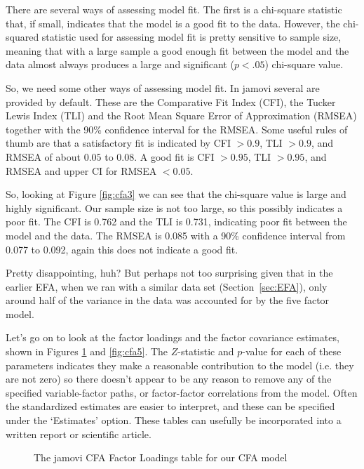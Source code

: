 There are several ways of assessing model fit. The first is a chi-square statistic that, if small, indicates that the model is a good fit to the data. However, the chi-squared statistic used for assessing model fit is pretty sensitive to sample size, meaning that with a large sample a good enough fit between the model and the data almost always produces a large and significant ($p<.05$) chi-square value. 

So, we need some other ways of assessing model fit. In jamovi several are provided by default. These are the Comparative Fit Index (CFI), the Tucker Lewis Index (TLI) and the Root Mean Square Error of Approximation (RMSEA) together with the 90\% confidence interval for the RMSEA. Some useful rules of thumb are that a satisfactory fit is indicated by CFI $>0.9$, TLI $>0.9$, and RMSEA of about $0.05$ to $0.08$. A good fit is CFI $>0.95$, TLI $>0.95$, and RMSEA and upper CI for RMSEA $<0.05$. 

So, looking at Figure \ref{fig:cfa3} we can see that the chi-square value is large and highly significant. Our sample size is not too large, so this possibly indicates a poor fit. The CFI is 0.762 and the TLI is 0.731, indicating poor fit between the model and the data. The RMSEA is 0.085 with a 90\% confidence interval from 0.077 to 0.092, again this does not indicate a good fit.  

Pretty disappointing, huh? But perhaps not too surprising given that in the earlier EFA, when we ran with a similar data set (Section~\ref{sec:EFA}), only around half of the variance in the data was accounted for by the five factor model. 

Let’s go on to look at the factor loadings and the factor covariance estimates, shown in Figures \ref{fig:cfa4} and \ref{fig:cfa5}. The $Z$-statistic and $p$-value for each of these parameters indicates they make a reasonable contribution to the model (i.e. they are not zero) so there doesn't appear to be any reason to remove any of the specified variable-factor paths, or factor-factor correlations from the model. Often the standardized estimates are easier to interpret, and these can be specified under the ‘Estimates’ option. These tables can usefully be incorporated into a written report or scientific article.

\begin{figure}[!htb]
\begin{center}
\caption{The jamovi CFA Factor Loadings table for our CFA model}
\label{fig:cfa4}
\HR
\end{center}
\end{figure}

